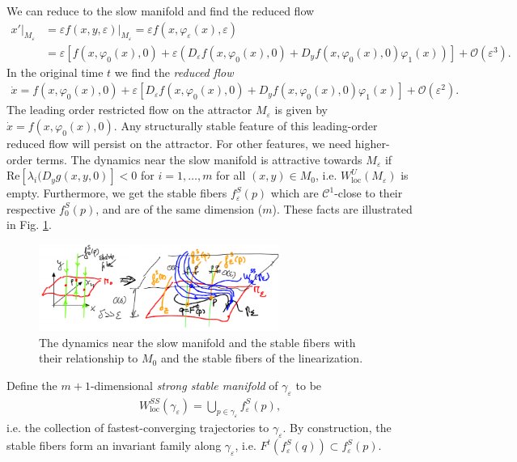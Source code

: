 We can reduce to the slow manifold and find the reduced flow
\begin{align}
	\left. x' \right|_{M_{\varepsilon}} &= \varepsilon\left. f(x,y, \varepsilon)\right|_{M_{\varepsilon }}	= \varepsilon f(x, \varphi_\varepsilon(x), \varepsilon) \\
					    &= \varepsilon \left[ f(x, \varphi_0 (x) , 0) + \varepsilon\left( D_{\varepsilon} f(x, \varphi_0(x), 0) + D_{y}f(x, \varphi_0 (x), 0) \varphi_1(x) \right) \right] + \mathcal{O}(\varepsilon ^{3}).
\end{align}
In the original time $t$ we find the \emph{reduced flow}
\begin{align}
	\boxed{
		\dot{x} = f(x, \varphi_0(x), 0) + \varepsilon \left[ D_{\varepsilon}f(x, \varphi_0(x), 0) + D_{y} f(x, \varphi_0(x), 0) \varphi_1(x) \right] + \mathcal{O}(\varepsilon^{2}).
	}
\end{align}
The leading order restricted flow on the attractor $M_{\varepsilon}$ is given by $\dot{x} = f(x, \varphi_0(x), 0)$. Any structurally stable feature of this leading-order reduced flow will persist on the attractor. For other features, we need higher-order terms. The dynamics near the slow manifold is attractive towards $M_{\varepsilon}$ if $ \textrm{Re} [\lambda_i ( D_{y}g(x,y,0)]<0$ for $i=1, \ldots, m$ for all $(x,y) \in M_0$, i.e. $W^{U}_{ \textrm{loc} }(M_{\varepsilon})$ is empty. Furthermore, we get the stable fibers $f_{\varepsilon}^{S}(p)$ which are $\mathcal{C}^{1}$-close to their respective $f_{0}^{S}(p)$, and are of the same dimension ($m$). These facts are illustrated in Fig. \ref{fig:perturbed_features}.

\begin{figure}[h!]
	\centering
	\includegraphics[width=0.7\textwidth]{figures/ch9/19perturbed_features.png}
	\caption{The dynamics near the slow manifold and the stable fibers with their relationship to $M_0$ and the stable fibers of the linearization.}
	\label{fig:perturbed_features}
\end{figure}

Define the $m+1$-dimensional \emph{strong stable manifold} of $\gamma_{\varepsilon}$ to be
\begin{align}
	W_{ \textrm{loc} }^{SS}(\gamma_{\varepsilon}) = \bigcup_{p \in \gamma_{\varepsilon}}f_{\varepsilon}^{S}(p),
\end{align}
i.e. the collection of fastest-converging trajectories to $\gamma_\varepsilon$. By construction, the stable fibers form an invariant family along $\gamma_{\varepsilon}$, i.e. $F^{t}(f^{S}_{\varepsilon}(q)) \subset f^{S}_{\varepsilon}(p)$.

